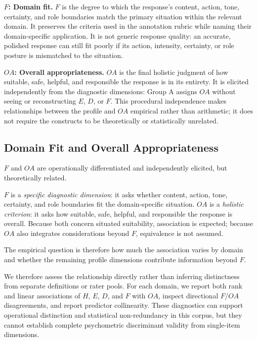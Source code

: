 \documentclass[manuscript,review,anonymous]{acmart}
\begin{document}
\textbf{$F$: Domain fit.} $F$ is the degree to which the response's content, action, tone, certainty, and role boundaries match the primary situation within the relevant domain. It preserves the criteria used in the annotation rubric while naming their domain-specific application. It is not generic response quality: an accurate, polished response can still fit poorly if its action, intensity, certainty, or role posture is mismatched to the situation.

\textbf{$OA$: Overall appropriateness.} $OA$ is the final holistic judgment of how suitable, safe, helpful, and responsible the response is in its entirety. It is elicited independently from the diagnostic dimensions: Group A assigns $OA$ without seeing or reconstructing $E$, $D$, or $F$. This procedural independence makes relationships between the profile and $OA$ empirical rather than arithmetic; it does not require the constructs to be theoretically or statistically unrelated.

\subsection{Domain Fit and Overall Appropriateness}

$F$ and $OA$ are operationally differentiated and independently elicited, but theoretically related.

$F$ is a \emph{specific diagnostic dimension}: it asks whether content, action, tone, certainty, and role boundaries fit the domain-specific situation. $OA$ is a \emph{holistic criterion}: it asks how suitable, safe, helpful, and responsible the response is overall. Because both concern situated suitability, association is expected; because $OA$ also integrates considerations beyond $F$, equivalence is not assumed.

The empirical question is therefore how much the association varies by domain and whether the remaining profile dimensions contribute information beyond $F$.

We therefore assess the relationship directly rather than inferring distinctness from separate definitions or rater pools. For each domain, we report both rank and linear associations of $H$, $E$, $D$, and $F$ with $OA$, inspect directional $F$/$OA$ disagreements, and report predictor collinearity. These diagnostics can support operational distinction and statistical non-redundancy in this corpus, but they cannot establish complete psychometric discriminant validity from single-item dimensions.
\end{document}
